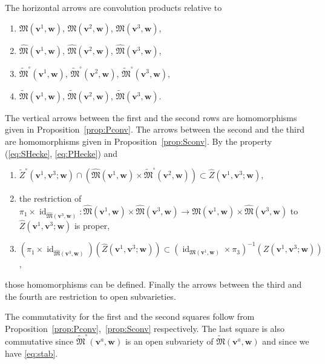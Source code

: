 \documentclass[12pt]{amsart}
\def\frak{\mathfrak}
\renewcommand{\labelenumi}{(\theenumi)}%
\newenvironment{aenume}{%
  \begin{enumerate}%
  \renewcommand{\theenumi}{\alph{enumi}}%
  \renewcommand{\labelenumi}{(\theenumi)}%
  }{\end{enumerate}}
\theoremstyle{definition}
\theoremstyle{remark}
\numberwithin{equation}{subsection}
\newcommand{\propref}[1]{Proposition~\ref{#1}}
\newcommand{\id}{\operatorname{id}}
\newcommand{\M}{{\frak M}} %
\newcommand{\bv}{{\mathbf v}} %
\newcommand{\bw}{{\mathbf w}} %
\newcommand{\Mp}{\widetilde\M}
\newcommand{\Mpp}{\widehat\M}
\begin{document}
The horizontal arrows are convolution products relative to
\begin{enumerate}
\item $\M(\bv^1,\bw)$, $\M(\bv^2,\bw)$,
      $\M(\bv^3,\bw)$,
\item $\Mpp(\bv^1,\bw)$, $\Mpp(\bv^2,\bw)$,
      $\Mpp(\bv^3,\bw)$,
\item $\Mp^\circ(\bv^1,\bw)$, $\Mp^\circ(\bv^2,\bw)$,
  $\Mp^\circ(\bv^3,\bw)$,
\item $\Mp(\bv^1,\bw)$, $\Mp(\bv^2,\bw)$,
      $\Mp(\bv^3,\bw)$.
\end{enumerate}
%
The vertical arrows between the first and the second rows are
homomorphisms given in \propref{prop:Pconv}. The arrows between the
second and the third are homomorphisms given in \propref{prop:Sconv}.
By the property (\ref{eq:SHecke}, \ref{eq:PHecke}) and
\begin{aenume}
\item $\widetilde Z^\circ(\bv^1,\bv^3;\bw)\cap
  \left(\Mpp(\bv^1,\bw)\times\Mp^\circ(\bv^2,\bw)\right)
  \subset \widehat Z(\bv^1,\bv^3;\bw)$,
%
\item the restriction of $\pi_1\times\id_{\Mpp(\bv^3,\bw)}\colon
  \Mpp(\bv^1,\bw)\times\Mpp(\bv^3,\bw)\to \M(\bv^1,\bw)\times
  \Mpp(\bv^3,\bw)$ to $\widehat Z(\bv^1,\bv^3;\bw)$ is proper,
\item $(\pi_1\times\id_{\Mpp(\bv^3,\bw)})(\widehat Z(\bv^1,\bv^3;\bw))
\subset (\id_{\M(\bv^1,\bw)}\times\pi_3)^{-1}(Z(\bv^1,\bv^3;\bw))$,
\end{aenume}
those homomorphisms can be defined.
%
Finally the arrows between the third and the fourth are restriction to
open subvarieties.

The commutativity for the first and the second squares follow from
\propref{prop:Pconv},~\ref{prop:Sconv} respectively. The last square
is also commutative since $\Mp^\circ(\bv^a,\bw)$ is an open subvariety
of $\Mp(\bv^a,\bw)$ and since we have \eqref{eq:stab}.
\end{document}
